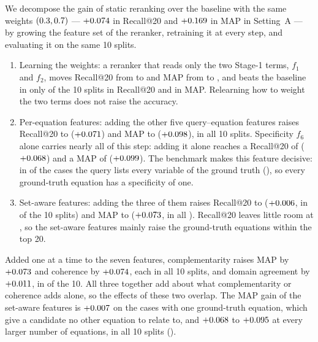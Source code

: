 We decompose the gain of static reranking over the baseline with the same weights
$(0.3, 0.7)$ --- $+0.074$ in Recall@20 and $+0.169$ in MAP in Setting~A --- by
growing the feature set of the reranker, retraining it at every step, and evaluating it on the same
10 splits.
\begin{enumerate}
  \item Learning the weights: a reranker that reads only the two Stage-1 terms, $f_1$ and $f_2$,
    moves Recall@20 from \RecASameW{} to \RecARTwo{} and MAP from \MapASameW{} to \MapARTwo, and
    beats the baseline in only \WinsRecStepOne{} of the 10 splits in Recall@20 and \WinsMapStepOne{} in
    MAP. Relearning how to weight the two terms does not raise the accuracy.
  \item Per-equation features: adding the other five query--equation features raises Recall@20 to
    \RecARSeven{} ($+0.071$) and MAP to \MapARSeven{} ($+0.098$), in all 10
    splits. Specificity $f_6$ alone carries nearly all of this step: adding it alone reaches a
    Recall@20 of \RecASpec{} ($+0.068$) and a MAP of \MapASpec{} ($+0.099$). The
    benchmark makes this feature decisive: in \NReqThreeTrivial{} of the \NCases{} cases the query
    lists every variable of the ground truth (), so every ground-truth
    equation has a specificity of one.
  \item Set-aware features: adding the three of them raises Recall@20 to \RecAProp{}
    ($+0.006$, in \WinsRecStepThree{} of the 10 splits) and MAP to \MapAProp{}
    ($+0.073$, in all \WinsMapStepThree). Recall@20 leaves little room at \RecARSeven, so the set-aware
    features mainly raise the ground-truth equations within the top 20.
\end{enumerate}
Added one at a time to the seven features, complementarity raises MAP by $+0.073$ and
coherence by $+0.074$, each in all 10 splits, and domain agreement by $+0.011$, in
\WinsMapDomAgree{} of the 10. All three together add about what complementarity or coherence adds
alone, so the effects of these two overlap. The MAP gain of the set-aware features is
$+0.007$ on the cases with one ground-truth equation, which give a candidate no other equation
to relate to, and $+0.068$ to $+0.095$ at every larger number of equations, in all 10
splits ().

\ifthesis{}\fi

